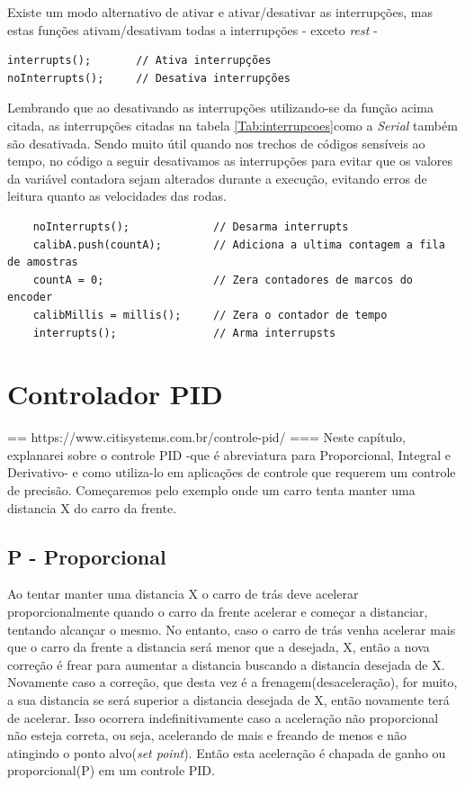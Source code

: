 \documentclass[a4paper,12pt,portuguese]{ufms-cpcx}
\begin{document}
Existe um modo alternativo de ativar e ativar\//desativar as interrupções, mas estas funções ativam\//desativam todas a interrupções - exceto \textit{rest} -
\begin{lstlisting}
interrupts();		// Ativa interrupções
noInterrupts();		// Desativa interrupções
\end{lstlisting}
Lembrando que ao desativando as interrupções utilizando-se da função acima citada, as interrupções citadas na tabela \ref{Tab:interrupcoes}como a \textit{Serial} também são desativada. Sendo muito útil quando nos trechos de códigos sensíveis ao tempo, no código a seguir desativamos as interrupções para evitar que os valores da variável contadora sejam alterados durante a execução, evitando erros de leitura quanto as velocidades das rodas.
\begin{lstlisting}
	noInterrupts();				// Desarma interrupts
	calibA.push(countA);		// Adiciona a ultima contagem a fila de amostras
	countA = 0;					// Zera contadores de marcos do encoder
	calibMillis = millis();		// Zera o contador de tempo
	interrupts();				// Arma interrupsts
\end{lstlisting}

\chapter{Controlador PID}\label{pid}
== https://www.citisystems.com.br/controle-pid/ ===
Neste capítulo, explanarei sobre o controle PID -que é abreviatura para Proporcional, Integral e Derivativo- e como utiliza-lo em aplicações de controle que requerem um controle de precisão. Começaremos pelo exemplo onde um carro tenta manter uma distancia X do carro da frente.

\section{P - Proporcional}
Ao tentar manter uma distancia X o carro de trás deve acelerar proporcionalmente quando o carro da frente acelerar e começar a distanciar, tentando alcançar o mesmo. No entanto, caso o carro de trás venha acelerar mais que o carro da frente a distancia será menor que a desejada, X, então a nova correção é frear para aumentar a distancia buscando a distancia desejada de X. Novamente caso a correção, que desta vez é a frenagem(desaceleração), for muito, a sua distancia se será superior a distancia desejada de X, então novamente terá de acelerar. Isso ocorrera indefinitivamente caso a aceleração não proporcional não esteja correta, ou seja, acelerando de mais e freando de menos e não atingindo o ponto alvo(\textit{set point}). Então esta aceleração é chapada de ganho ou proporcional(P) em um controle PID.
\end{document}
